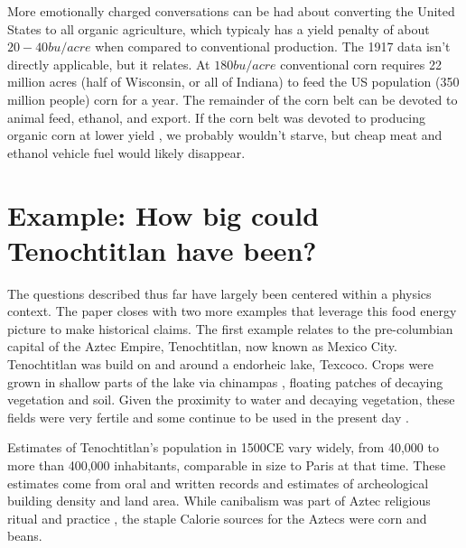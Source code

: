 \documentclass[12pt]{iopart}
\begin{document}
%
%
More emotionally charged conversations can be had about converting the United States to all organic agriculture, which typicaly has a yield penalty of about $20-40bu/acre$ when compared to conventional production.  The 1917 data isn't directly applicable, but it relates. At $180bu/acre$ conventional corn requires 22 million acres (half of Wisconsin, or all of Indiana) to feed the US population (350 million people) corn for a year.  The remainder of the corn belt can be devoted to animal feed, ethanol, and export.  If the corn belt was devoted to producing organic corn at lower yield \cite{organic_corn_yield}, we probably wouldn't starve, but cheap meat and ethanol vehicle fuel would likely disappear.   
%

\section{Example: How big could Tenochtitlan have been?}
The questions described thus far have largely been centered within a physics context.  The paper closes with two more examples that leverage this food energy picture to make historical claims.  The first example relates to the pre-columbian capital of the Aztec Empire, Tenochtitlan, now known as Mexico City.  Tenochtitlan was build on and around a endorheic lake, Texcoco.  Crops were grown in shallow parts of the lake via chinampas \cite{national_geo}, floating patches of decaying vegetation and soil.  Given the proximity to water and decaying vegetation, these fields were very fertile \cite{HortTech_2019,Chinampas_1964} and some continue to be used in the present day \cite{google_earth}.  


Estimates of Tenochtitlan's population in 1500CE vary widely, from 40,000 \cite{40k} to more than 400,000 \cite{400k} inhabitants, comparable in size to Paris at that time. These estimates come from oral and written records and estimates of archeological building density and land area.   While canibalism was part of Aztec religious ritual and practice \cite{Aztec_Cannibalism}, the staple Calorie sources for the Aztecs were corn and beans.
\end{document}
